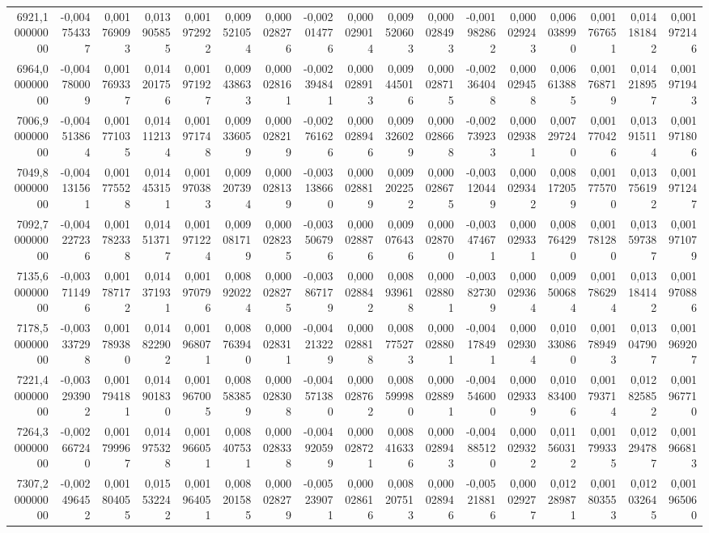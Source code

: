 \begin{longtable}{rrrrrrrrrrrrrrrrr}
6921,100000000 & -0,004754337 & 0,001769093 & 0,013905855 & 0,001972922 & 0,009521054 & 0,000028276 & -0,002014776 & 0,000029014 & 0,009520603 & 0,000028493 & -0,001982862 & 0,000029243 & 0,006038990 & 0,001767651 & 0,014181842 & 0,001972146\\
6964,000000000 & -0,004780009 & 0,001769337 & 0,014201756 & 0,001971927 & 0,009438633 & 0,000028161 & -0,002394841 & 0,000028913 & 0,009445016 & 0,000028715 & -0,002364048 & 0,000029458 & 0,006613885 & 0,001768719 & 0,014218957 & 0,001971943\\
7006,900000000 & -0,004513864 & 0,001771035 & 0,014112134 & 0,001971748 & 0,009336059 & 0,000028219 & -0,002761626 & 0,000028946 & 0,009326029 & 0,000028668 & -0,002739233 & 0,000029381 & 0,007297240 & 0,001770426 & 0,013915114 & 0,001971806\\
7049,800000000 & -0,004131561 & 0,001775528 & 0,014453151 & 0,001970383 & 0,009207394 & 0,000028139 & -0,003138660 & 0,000028819 & 0,009202252 & 0,000028675 & -0,003120449 & 0,000029342 & 0,008172059 & 0,001775700 & 0,013756192 & 0,001971247\\
7092,700000000 & -0,004227236 & 0,001782338 & 0,014513717 & 0,001971224 & 0,009081719 & 0,000028235 & -0,003506796 & 0,000028876 & 0,009076436 & 0,000028700 & -0,003474671 & 0,000029331 & 0,008764290 & 0,001781280 & 0,013597387 & 0,001971079\\
7135,600000000 & -0,003711496 & 0,001787172 & 0,014371931 & 0,001970796 & 0,008920224 & 0,000028275 & -0,003867179 & 0,000028842 & 0,008939618 & 0,000028801 & -0,003827309 & 0,000029364 & 0,009500684 & 0,001786294 & 0,013184142 & 0,001970886\\
7178,500000000 & -0,003337298 & 0,001789380 & 0,014822902 & 0,001968071 & 0,008763940 & 0,000028311 & -0,004213229 & 0,000028818 & 0,008775273 & 0,000028801 & -0,004178491 & 0,000029304 & 0,010330860 & 0,001789493 & 0,013047907 & 0,001969207\\
7221,400000000 & -0,003293902 & 0,001794181 & 0,014901830 & 0,001967005 & 0,008583859 & 0,000028308 & -0,004571380 & 0,000028762 & 0,008599980 & 0,000028891 & -0,004546000 & 0,000029339 & 0,010834006 & 0,001793714 & 0,012825852 & 0,001967710\\
7264,300000000 & -0,002667240 & 0,001799967 & 0,014975328 & 0,001966051 & 0,008407531 & 0,000028338 & -0,004920599 & 0,000028721 & 0,008416336 & 0,000028943 & -0,004885120 & 0,000029322 & 0,011560312 & 0,001799335 & 0,012294787 & 0,001966813\\
7307,200000000 & -0,002496452 & 0,001804055 & 0,015532242 & 0,001964051 & 0,008201585 & 0,000028279 & -0,005239071 & 0,000028616 & 0,008207513 & 0,000028946 & -0,005218816 & 0,000029277 & 0,012289871 & 0,001803553 & 0,012032645 & 0,001965060\\

\end{longtable}
